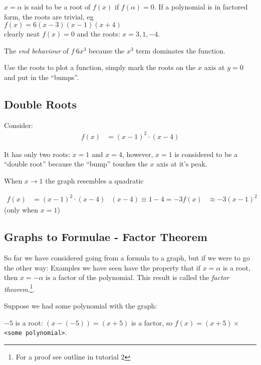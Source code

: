 $x = \alpha$ is said to be a root of $f(x)$ if $f(\alpha) = 0$. If a
polynomial is in factored form, the roots are trivial, eg \\
$f(x) = 6(x-3)(x-1)(x+4)$ \\
clearly neat $f(x) = 0$ and the roots: $x = 3,1,-4$.

The \emph{end behaviour} of $f ~ 6x^3$ because the $x^3$ term dominates the
function.

Use the roots to plot a function, simply mark the roots on the $x$ axis at $y=0$
and put in the ``bumps''.


\subsection{Double Roots}
\label{subsec: P Polynomial Roots Double Roots}
Consider:
\begin{align}
  f(x) & = (x-1)^2 \cdot (x-4) \nonumber
\end{align}

It has only two roots: $x = 1$ and $x = 4$, however, $x=1$ is considered to be a
``double root'' because the ``bump'' touches the $x$ axis at it's peak.

When $x \to 1$ the graph resembles a quadratic

\begin{align}
  f(x) & = (x-1)^2 \cdot (x-4) \nonumber
       & (x-4) \equiv 1-4 = -3 \nonumber
  f(x) & \approx -3(x-1)^2 \nonumber
\end{align}
(only when $x=1$)


\subsection{Graphs to Formulae - Factor Theorem}
So far we have considered going from a formula to a graph, but if we were to go
the other way:
Examples we have seen have the property that if $x = \alpha$ is a root, then
$x = - \alpha$ is a factor of the polynomial. This result is called the
\emph{factor theorem}.\footnote{For a proof see outline in tutorial 2}.


Suppose we had some polynomial with the graph:

$-5$ is a root: $(x- (-5)) = (x+5)$ is a factor, so $f(x) = (x+5) \times $ \texttt{<some polynomial>}.


